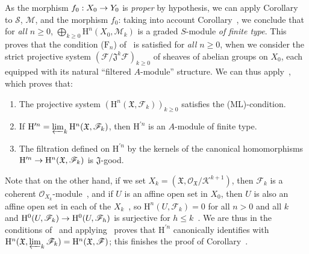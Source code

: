 \documentclass[oneside]{amsart}
\theoremstyle{ega-env-style}
\theoremstyle{ega-thm-env-style}
\theoremstyle{ega-defn-env-style}
\def\mathcal{\mathscr}
\def\sh{\mathcal}                   %
\def\leq{\leqslant}                 %
\def\geq{\geqslant}                 %
\def\HH{\mathrm{H}}                 %
\renewcommand{\to}{\mathchoice{\longrightarrow}{\rightarrow}{\rightarrow}{\rightarrow}}
\begin{document}
As the morphism $f_0:X_0\to Y_0$ is \emph{proper} by hypothesis, we can apply Corollary~ to $\sh{S}$, $\sh{M}$, and the morphism $f_0$: taking into account Corollary~, we conclude that for \emph{all $n\geq 0$}, $\bigoplus_{k\geq 0}\HH^n(X_0,\sh{M}_k)$ is a graded $S$-module \emph{of finite type}.
This proves that the condition ($\text{F}_n$) of~ is satisfied for \emph{all $n\geq 0$}, when we consider the strict projective system $(\sh{F}/\mathfrak{J}^k\sh{F})_{k\geq 0}$ of sheaves of abelian groups on $X_0$, each equipped with its natural ``filtered $A$-module'' structure.
We can thus apply~, which proves that:
\begin{enumerate}
  \item[1st.] The projective system $(\HH^n(\mathfrak{X},\sh{F}_k))_{k\geq 0}$ satisfies the (ML)-condition.
  \item[2nd.] If $\HH^{\prime n}=\varprojlim_k\HH^n(\mathfrak{X},\sh{F}_k)$, then $\HH^{\prime n}$ is an $A$-module of finite type.
  \item[3rd.] The filtration defined on $\HH^{\prime n}$ by the kernels of the canonical homomorphisms $\HH^{\prime n}\to\HH^n(\mathfrak{X},\sh{F}_k)$ is $\mathfrak{J}$-good.
\end{enumerate}

Note that on the other hand, if we set $X_k=(\mathfrak{X},\sh{O}_\mathfrak{X}/\sh{K}^{k+1})$, then $\sh{F}_k$ is a coherent $\sh{O}_{X_k}$-module~, and if $U$ is an affine open set in $X_0$, then $U$ is also an affine open set in each of the $X_k$~, so $\HH^n(U,\sh{F}_k)=0$ for all $n>0$ and all $k$~ and $\HH^0(U,\sh{F}_k)\to\HH^0(U,\sh{F}_h)$ is surjective for $h\leq k$~.
We are thus in the conditions of~ and applying~ proves that $\HH^{\prime n}$ canonically identifies with $\HH^n(\mathfrak{X},\varprojlim_k\sh{F}_k)=\HH^n(\mathfrak{X},\sh{F})$; this finishes the proof of Corollary~.
\end{document}
